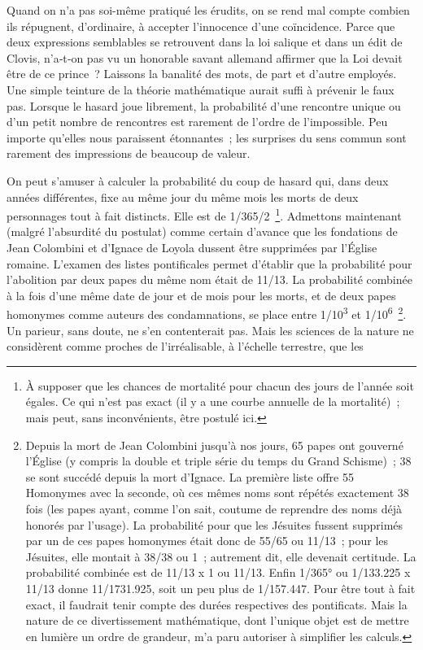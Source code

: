 \documentclass[french,twoside]{book} %
\begin{document}
\noindent Quand on n’a pas soi-même pratiqué les érudits, on se rend mal compte combien ils répugnent, d’ordinaire, à accepter l’innocence d’une coïn­cidence. Parce que deux expressions semblables se retrouvent dans la loi salique et dans un édit de Clovis, n’a‑t‑on pas vu un honorable savant allemand affirmer que la Loi devait être de ce prince ? Laissons la banalité des mots, de part et d’autre employés. Une simple teinture de la théorie mathématique aurait suffi à prévenir le faux pas. Lorsque le hasard joue librement, la probabilité d’une rencontre unique ou d’un petit nombre de rencontres est rarement de l’ordre de l’impossible. Peu importe qu’elles nous paraissent étonnantes ; les surprises du sens commun sont rarement des impressions de beaucoup de valeur.\par
On peut s’amuser à calculer la probabilité du coup de hasard qui, dans deux années différentes, fixe au même jour du même mois les morts de deux personnages tout à fait distincts. Elle est de 1/365/2 \footnote{À supposer que les chances de mortalité pour chacun des jours de l’année soit égales. Ce qui n’est pas exact (il y a une courbe annuelle de la mortalité) ; mais peut, sans inconvénients, être postulé ici.}. Admettons maintenant (malgré l’absurdité du postulat) comme certain d’avance que les fondations de Jean Colombini et d’Ignace de Loyola dussent être supprimées par l’Église romaine. L’examen des listes pontificales permet d’établir que la probabilité pour l’abolition par deux papes du même nom était de 11/13. La probabilité combinée à la fois d’une même date de jour et de mois pour les morts, et de deux papes homonymes comme auteurs des condamnations, se place entre 1/10\textsuperscript{3} et 1/10\textsuperscript{6} \footnote{Depuis la mort de Jean Colombini jusqu’à nos jours, 65 papes ont gouverné l’Église (y compris la double et triple série du temps du Grand Schisme) ; 38 se sont succédé depuis la mort d’Ignace. La première liste offre 55 Homonymes avec la seconde, où ces mêmes noms sont répétés exactement 38 fois (les papes ayant, comme l’on sait, coutume de reprendre des noms déjà honorés par l’usage). La probabilité pour que les Jésuites fussent supprimés par un de ces papes homonymes était donc de 55/65 ou 11/13 ; pour les Jésuites, elle montait à 38/38 ou 1 ; autrement dit, elle devenait certitude. La probabilité combinée est de 11/13 x 1 ou 11/13. Enfin 1/365° ou 1/133.225 x 11/13 donne 11/1731.925, soit un peu plus de 1/157.447. Pour être tout à fait exact, il faudrait tenir compte des durées respectives des pontificats. Mais la nature de ce divertissement mathématique, dont l’unique objet est de mettre en lumière un ordre de grandeur, m’a paru autoriser à sim­plifier les calculs.}. Un parieur, sans doute, ne s’en contenterait pas. Mais les sciences de la nature ne considèrent comme proches de l’irréalisable, à l’échelle terrestre, que les  
\end{document}
